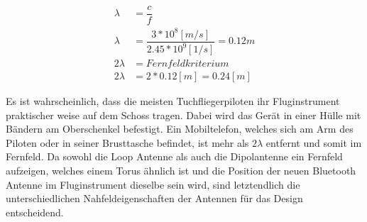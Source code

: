 \begin{eqnarray}
\lambda &=\dfrac{c}{f} \\
\lambda &=\dfrac{3*10^{8} [m/s]}{2.45*10^{9} [1/s]}=0.12m\\ 
2\lambda &= Fernfeldkriterium\\ 
2\lambda &= 2*0.12[m] =0.24 [m] \label{eq:Fernfeld}
\end{eqnarray}

Es ist wahrscheinlich, dass die meisten Tuchfliegerpiloten ihr Fluginstrument praktischer weise auf dem Schoss tragen. Dabei wird das Gerät in einer Hülle mit Bändern am Oberschenkel befestigt. Ein Mobiltelefon, welches sich am Arm des Piloten oder in seiner Brusttasche befindet, ist mehr als $2\lambda$ entfernt und somit im Fernfeld. Da sowohl die Loop Antenne als auch die Dipolantenne ein  Fernfeld aufzeigen, welches einem Torus ähnlich ist und die Position der neuen Bluetooth Antenne im Fluginstrument dieselbe sein wird, sind letztendlich die unterschiedlichen Nahfeldeigenschaften der Antennen für das Design entscheidend.

